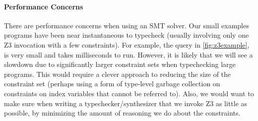\paragraph{Performance Concerns}
There are performance concerns when using an SMT solver.
Our small examples programs have been near instantaneous to typecheck (usually involving only one Z3 invocation with a few constraints).
For example, the query in \autoref{fig:z3example}, is very small and takes milliseconds to run.
However, it is likely that we will see a slowdown due to significantly larger constraint sets when typechecking large \wasm programs.
This would require a clever approach to reducing the size of the constraint set (perhaps using a form of type-level garbage collection on constraints on index variables that cannot be referred to).
Also, we would want to make sure when writing a typechecker/synthesizer that we invoke Z3 as little as possible, by minimizing the amount of reasoning we do about the constraints.